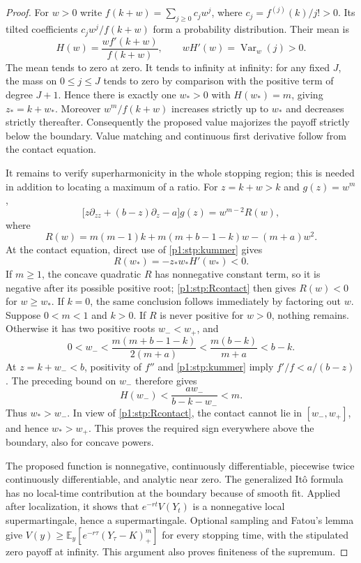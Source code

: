 \documentclass[11pt,a4paper]{article}
\theoremstyle{definition}
\theoremstyle{remark}
\numberwithin{equation}{section}
\begin{document}
\begin{proof}
For $w>0$ write
$f(k+w)=\sum_{j\ge0}c_jw^j$, where
$c_j=f^{(j)}(k)/j!>0$.  Its tilted coefficients
$c_jw^j/f(k+w)$ form a probability distribution.  Their mean is
\[
 H(w)=\frac{wf'(k+w)}{f(k+w)},\qquad
 wH'(w)=\operatorname{Var}_w(j)>0.
\]
The mean tends to zero at zero.  It tends to infinity at infinity:
for any fixed $J$, the mass on $0\le j\le J$ tends to zero by
comparison with the positive term of degree $J+1$.  Hence there is
exactly one $w_*>0$ with $H(w_*)=m$, giving $z_*=k+w_*$.
Moreover $w^m/f(k+w)$ increases strictly up to $w_*$ and decreases
strictly thereafter.  Consequently the proposed value majorizes the
payoff strictly below the boundary.  Value matching and continuous
first derivative follow from the contact equation.

It remains to verify superharmonicity in the whole stopping region;
this is needed in addition to locating a maximum of a ratio.
For $z=k+w>k$ and $g(z)=w^m$,
\begin{equation}\label{p1:stp:R}
 \bigl[z\partial_{zz}+(b-z)\partial_z-a\bigr]g(z)
 =w^{m-2}R(w),
\end{equation}
where
\[
 R(w)=m(m-1)k+m(m+b-1-k)w-(m+a)w^2.
\]
At the contact equation, direct use of \eqref{p1:stp:kummer} gives
\begin{equation}\label{p1:stp:Rcontact}
 R(w_*)=-z_*w_*H'(w_*)<0.
\end{equation}
If $m\ge1$, the concave quadratic $R$ has nonnegative constant
term, so it is negative after its possible positive root;
\eqref{p1:stp:Rcontact} then gives $R(w)<0$ for $w\ge w_*$.
If $k=0$, the same conclusion follows immediately by factoring out
$w$.  Suppose $0<m<1$ and $k>0$.  If $R$ is never positive for
$w>0$, nothing remains.  Otherwise it has two positive roots
$w_-<w_+$, and
\[
 0<w_-<\frac{m(m+b-1-k)}{2(m+a)}
       <\frac{m(b-k)}{m+a}<b-k.
\]
At $z=k+w_-<b$, positivity of $f''$ and
\eqref{p1:stp:kummer} imply $f'/f<a/(b-z)$.  The preceding bound on
$w_-$ therefore gives
\[
 H(w_-)<\frac{aw_-}{b-k-w_-}<m.
\]
Thus $w_*>w_-$.  In view of \eqref{p1:stp:Rcontact}, the contact cannot
lie in $[w_-,w_+]$, and hence $w_*>w_+$.  This proves the required
sign everywhere above the boundary, also for concave powers.

The proposed function is nonnegative, continuously differentiable,
piecewise twice continuously differentiable, and analytic near zero.
The generalized It\^o formula has no local-time contribution at the
boundary because of smooth fit.  Applied after localization, it shows
that $e^{-rt}V(Y_t)$ is a nonnegative local supermartingale, hence a
supermartingale.  Optional sampling and Fatou's lemma give
$V(y)\ge\mathbb E_y[e^{-r\tau}(Y_\tau-K)_+^m]$ for every stopping
time, with the stipulated zero payoff at infinity.  This argument
also proves finiteness of the supremum.


\end{proof}
\end{document}
